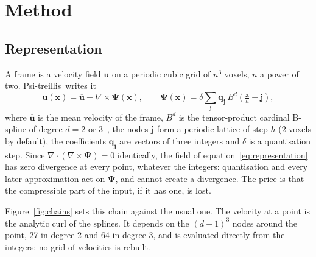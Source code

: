 \documentclass[11pt,a4paper]{article}
\newcommand{\codec}{Psi-treillis}
\begin{document}
\section{Method}
\label{sec:method}

\subsection{Representation}

A frame is a velocity field $\mathbf{u}$ on a periodic cubic grid of $n^3$ voxels, $n$ a power of two. \codec\ writes it
\begin{equation}
  \mathbf{u}(\mathbf{x}) = \overline{\mathbf{u}} + \nabla \times \boldsymbol{\Psi}(\mathbf{x}), \qquad
  \boldsymbol{\Psi}(\mathbf{x}) = \delta \sum_{\mathbf{j}} \mathbf{q}_{\mathbf{j}}\,
  B^{d}\!\left(\tfrac{\mathbf{x}}{h} - \mathbf{j}\right),
  \label{eq:representation}
\end{equation}
where $\overline{\mathbf{u}}$ is the mean velocity of the frame, $B^{d}$ is the tensor-product cardinal B-spline of
degree $d = 2$ or $3$~\cite{unser1999splines}, the nodes $\mathbf{j}$ form a periodic lattice of step $h$ (2 voxels by
default), the coefficients $\mathbf{q}_{\mathbf{j}}$ are vectors of three integers and $\delta$ is a quantisation step.
Since $\nabla\cdot(\nabla\times\boldsymbol{\Psi}) = 0$ identically, the field of equation~\eqref{eq:representation}
has zero divergence at every point, whatever the integers: quantisation and every later approximation act on
$\boldsymbol{\Psi}$, and cannot create a divergence. The price is that the compressible part of the input, if it has
one, is lost.

Figure~\ref{fig:chains} sets this chain against the usual one. The velocity at a point is the analytic curl of the splines. It depends on the $(d+1)^3$ nodes around the point, 27
in degree 2 and 64 in degree 3, and is evaluated directly from the integers: no grid of velocities is rebuilt.
\end{document}
